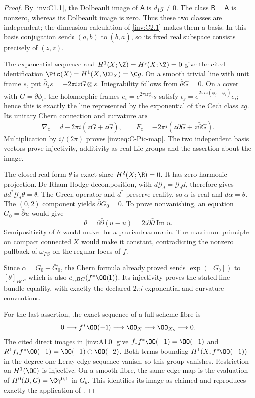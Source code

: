 \begin{proof}

By \ref{inv:C1.1}, the Dolbeault image of $\mathsf A$ is
$d_1g\ne0$. The class $\mathsf B=\overline{\mathsf A}$ is nonzero,
whereas its Dolbeault image is zero. Thus these two classes are
independent; the dimension calculation of \ref{inv:C2.1} makes
them a basis. In this basis conjugation sends $(a,b)$ to
$(\bar b,\bar a)$, so its fixed real subspace consists precisely
of $(z,\bar z)$.

The exponential sequence and $H^1(X;\Z)=H^2(X;\Z)=0$ give the
cited identification $\Pic(X)=H^1(X,\OO_X)=\C g$.
On a smooth trivial line with unit frame $s$, put
$\bar\partial_zs=-2\pi izG\otimes s$. Integrability follows from
$\bar\partial G=0$. On a cover with $G=\bar\partial\phi_i$,
the holomorphic frames $e_i=e^{2\pi iz\phi_i}s$ satisfy
$e_j=e^{2\pi iz(\phi_j-\phi_i)}e_i$; hence this is exactly the
line represented by the exponential of the Cech class $zg$.
Its unitary Chern connection and curvature are
\[
 \nabla_z=d-2\pi i(zG+\bar z\bar G),\qquad
 F_z=-2\pi i(z\partial G+\bar z\bar\partial\bar G).
\]
Multiplication by $i/(2\pi)$ proves \eqref{inv:eq:C-Pic-map}.
The two independent basis vectors prove injectivity, additivity
as real Lie groups and the assertion about the image.

The closed real form $\theta$ is exact since $H^2(X;\R)=0$.
It has zero harmonic projection. De Rham Hodge decomposition,
with $d\mathcal G_d=\mathcal G_dd$, therefore gives
$dd^*\mathcal G_d\theta=\theta$. The Green operator and $d^*$
preserve reality, so $\alpha$ is real and $d\alpha=\theta$.
The $(0,2)$ component yields $\bar\partial G_0=0$.
To prove nonvanishing, an equation $G_0=\bar\partial u$ would give
\[
 \theta=\partial\bar\partial(u-\bar u)
       =2i\partial\bar\partial\operatorname{Im}u.
\]
Semipositivity of $\theta$ would make $\operatorname{Im}u$
plurisubharmonic. The maximum principle on compact connected $X$
would make it constant, contradicting the nonzero pullback of
$\omega_{FS}$ on the regular locus of $f$.

Since $\alpha=G_0+\bar G_0$, the Chern formula already proved
sends $\exp([G_0])$ to $[\theta]_{BC}$, which is also
$c_{1,BC}(f^*\OO(1))$. Its injectivity proves the stated
line-bundle equality, with exactly the declared $2\pi i$
exponential and curvature conventions.

For the last assertion, the exact sequence of a full scheme
fibre is
\[
 0\longrightarrow f^*\OO(-1)\longrightarrow\OO_X
   \longrightarrow\OO_{X_b}\longrightarrow0.
\]
The cited direct images in \ref{inv:A1.0} give
$f_*f^*\OO(-1)=\OO(-1)$ and
$R^1f_*f^*\OO(-1)=\OO(-1)\oplus\OO(-2)$.
Both terms bounding $H^1(X,f^*\OO(-1))$ in the degree-one Leray
edge sequence vanish, so this group vanishes. Restriction on
$H^1(\OO)$ is injective. On a smooth fibre, the same edge map is
the evaluation of $H^0(B,G)=\C\gamma^{0,1}$ in $G_b$.
This identifies its image as claimed and reproduces exactly
the application of \cite[Theorem~10.5(b), Step~4, p.~88]{AC2026}.

\end{proof}
